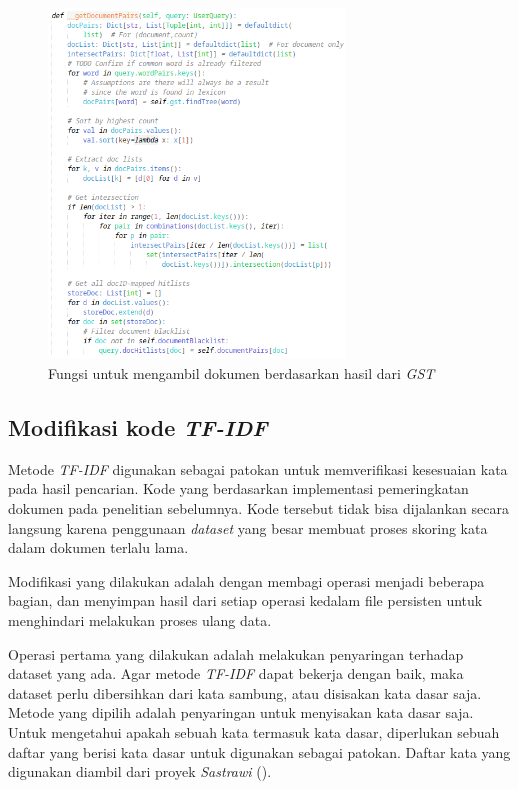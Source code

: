 \begin{figure}[H]
  \centering{}
	\includegraphics[width=0.7\textwidth]{gambar/implementasi_gst_getdocumentpairs}
  \caption{Fungsi untuk mengambil dokumen berdasarkan hasil dari \textit{GST}}
\end{figure}

\subsection{Modifikasi kode \textit{TF-IDF}}

Metode \textit{TF-IDF} digunakan sebagai patokan untuk memverifikasi kesesuaian 
kata pada hasil pencarian. Kode yang berdasarkan implementasi pemeringkatan 
dokumen pada penelitian sebelumnya. Kode tersebut tidak bisa dijalankan secara 
langsung karena penggunaan \textit{dataset} yang besar membuat proses skoring 
kata dalam dokumen terlalu lama.

Modifikasi yang dilakukan adalah dengan membagi operasi menjadi beberapa bagian, 
dan menyimpan hasil dari setiap operasi kedalam file persisten untuk menghindari 
melakukan proses ulang data.

Operasi pertama yang dilakukan adalah melakukan penyaringan terhadap dataset
yang ada. Agar metode \textit{TF-IDF} dapat bekerja dengan baik, maka dataset
perlu dibersihkan dari kata sambung, atau disisakan kata dasar saja. Metode yang
dipilih adalah penyaringan untuk menyisakan kata dasar saja. Untuk mengetahui 
apakah sebuah kata termasuk kata dasar, diperlukan sebuah daftar yang berisi 
kata dasar untuk digunakan sebagai patokan. Daftar kata yang digunakan diambil 
dari proyek \textit{Sastrawi} (\cite{sastrawi}).

